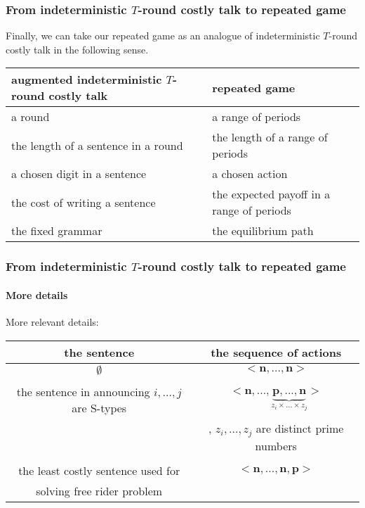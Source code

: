\documentclass[9pt,handout]{beamer}
\begin{document}
\begin{frame}
  \frametitle{From indeterministic $T$-round costly talk to repeated game}

Finally, we can take our repeated game as an analogue of indeterministic $T$-round costly talk in the following sense.

\begin{center}
\begin{table}[h]
\begin{tabular}{ll }
augmented indeterministic $T$-round costly talk & repeated game \\
\hline
a round & a range of periods\\
the length of a sentence in a round & the length of a range of periods\\
a chosen digit in a sentence & a chosen action\\
the cost of writing a sentence & the expected payoff in a range of periods\\
the fixed grammar & the equilibrium path
\end{tabular}
\end{table}
\end{center}
\end{frame}


\begin{frame}
  \frametitle{From indeterministic $T$-round costly talk to repeated game}
\framesubtitle{More details}

More relevant details:


\begin{center}
\begin{table}[h]
\begin{tabular}{cc }
the sentence & the sequence of actions \\
\hline
$\emptyset$ & $<\textbf{n},...,\textbf{n}>$\\
\\
the sentence in announcing $i,...,j$ are S-types & $<\textbf{n},...,\underbrace{\textbf{p},...,\textbf{n}}_{z_i\times ...\times z_j}>$\\
 & , $z_i,...,z_j$ are distinct prime numbers \\
 \\
the least costly sentence used for  & $<\textbf{n},...,\textbf{n},\textbf{p}>$\\
solving free rider problem & \\
\end{tabular}
\end{table}
\end{center}



\end{frame}
\end{document}
